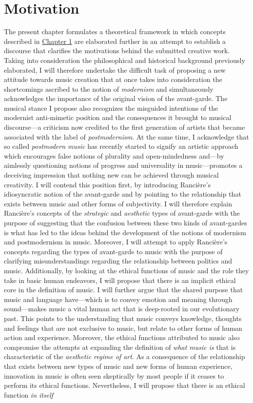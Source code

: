 \hypertarget{chapter2}{}
\chapter{Motivation}

The present chapter formulates a theoretical framework in which concepts described in \hyperlink{chapter1}{Chapter 1} are elaborated further in an attempt to establish a discourse that clarifies the motivations behind the submitted creative work. Taking into consideration the philosophical and historical background previously elaborated, I will therefore undertake the difficult task of proposing a new attitude towards music creation that at once takes into consideration the shortcomings ascribed to the notion of \emph{modernism} and simultaneously acknowledges the importance of the original vision of the avant-garde. The musical stance I propose also recognizes the misguided intentions of the modernist anti-mimetic position and the consequences it brought to musical discourse---a criticism now credited to the first generation of artists that became associated with the label of \emph{postmodernism}. At the same time, I acknowledge that so called \emph{postmodern music} has recently started to signify an artistic approach which encourages false notions of plurality and open-mindedness and---by aimlessly questioning notions of progress and universality in music---promotes a deceiving impression that nothing new can be achieved through musical creativity. I will contend this position first, by introducing Ranci\`{e}re's idiosyncratic notion of the avant-garde and by pointing to the relationship that exists between music and other forms of subjectivity. I will therefore explain Ranci\`{e}re's concepts of the \emph{strategic} and \emph{aesthetic} types of avant-garde with the purpose of suggesting that the confusion between these two kinds of avant-gardes is what has led to the ideas behind the development of the notions of modernism and postmodernism in music. Moreover, I will attempt to apply Ranci\`{e}re's concepts regarding the types of avant-garde to music with the purpose of clarifying misunderstandings regarding the relationship between politics and music. Additionally,  by looking at the ethical functions of music and the role they take in basic human endeavors, I will propose that there is an implicit ethical core in the definition of music. I will further argue that the shared purpose that music and language have---which is to convey emotion and meaning through sound---makes music a vital human act that is deep-rooted in our evolutionary past. This points to the understanding that music conveys knowledge, thoughts and feelings that are not exclusive to music, but relate to other forms of human action and experience. Moreover, the ethical functions attributed to music also compromise the attempts at expanding the definition of \emph{what music is} that is characteristic of the \emph{aesthetic regime of art}. As a consequence of the relationship that exists between new types of music and new forms of human experience, innovation in music is often seen skeptically by most people if it ceases to perform its ethical functions. Nevertheless, I will propose that there is an ethical function \emph{in itself} 